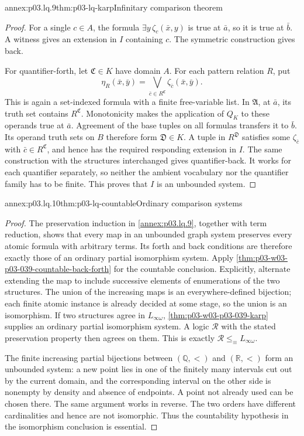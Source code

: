 \begin{annexitem}{annex:p03.lq.9}{thm:p03-lq-karp}{Infinitary comparison theorem}
\begin{proof}
For a single \(c\in A\), the formula
\(\exists y\,\zeta_c(\bar x,y)\) is true at \(\bar a\),
so it is true at \(\bar b\). A witness gives an extension in
\(I\) containing \(c\). The symmetric construction gives back.

For quantifier-forth, let \(\mathfrak C\in K\) have domain \(A\).
For each pattern relation \(R\), put
\[
 \eta_R(\bar x,\bar y)
      =\bigvee_{\bar c\in R^{\mathfrak C}}
                    \zeta_{\bar c}(\bar x,\bar y).
\]
This is again a set-indexed formula with a finite free-variable
list. In \(\mathfrak A\), at \(\bar a\), its truth set contains
\(R^{\mathfrak C}\). Monotonicity makes the application of
\(Q_K\) to these operands true at \(\bar a\).
Agreement of the base tuples on all formulas transfers it to
\(\bar b\). Its operand truth sets on \(B\) therefore form
\(\mathfrak D\in K\). A tuple in \(R^{\mathfrak D}\) satisfies
some \(\zeta_{\bar c}\) with \(\bar c\in R^{\mathfrak C}\),
and hence has the required responding extension in \(I\).
The same construction with the structures interchanged gives
quantifier-back. It works for each quantifier separately, so
neither the ambient vocabulary nor the quantifier family has to
be finite. This proves that \(I\) is an unbounded system.
\end{proof}
\end{annexitem}

\begin{annexitem}{annex:p03.lq.10}{thm:p03-lq-countable}{Ordinary comparison systems}
\begin{proof}
The preservation induction in \cref{annex:p03.lq.9}, together
with term reduction, shows that every map in an unbounded graph
system preserves every atomic formula with arbitrary terms.
Its forth and back conditions are therefore exactly those of an
ordinary partial isomorphism system. Apply
\cref{thm:p03-w03-p03-039-countable-back-forth} for the countable
conclusion. Explicitly, alternate extending the map to include
successive elements of enumerations of the two structures. The
union of the increasing maps is an everywhere-defined bijection;
each finite atomic instance is already decided at some stage,
so the union is an isomorphism.
If two structures agree in \(L_{\infty\omega}\),
\cref{thm:p03-w03-p03-039-karp} supplies an ordinary partial
isomorphism system. A logic \(\mathscr R\) with the stated
preservation property then agrees on them. This is exactly
\(\mathscr R\leq_{\equiv}L_{\infty\omega}\).

The finite increasing partial bijections between \((\mathbb Q,<)\)
and \((\mathbb R,<)\) form an unbounded system: a new point lies
in one of the finitely many intervals cut out by the current domain,
and the corresponding interval on the other side is nonempty by
density and absence of endpoints. A point not already used can be
chosen there. The same argument works in reverse. The two orders
have different cardinalities and hence are not isomorphic. Thus
the countability hypothesis in the isomorphism conclusion is essential.
\end{proof}
\end{annexitem}

